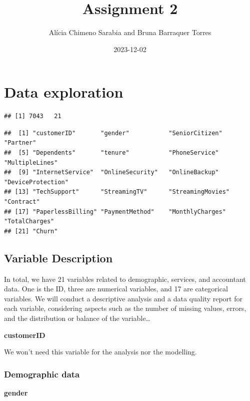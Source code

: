 \documentclass[
  twoside]{article}
\title{Assignment 2}
\author{Alícia Chimeno Sarabia and Bruna Barraquer Torres}
\date{2023-12-02}
\begin{document}
\maketitle

{
\setcounter{tocdepth}{2}
\tableofcontents
}
\newpage

\hypertarget{data-exploration}{%
\section{Data exploration}\label{data-exploration}}

\begin{verbatim}
## [1] 7043   21
\end{verbatim}

\begin{verbatim}
##  [1] "customerID"       "gender"           "SeniorCitizen"    "Partner"         
##  [5] "Dependents"       "tenure"           "PhoneService"     "MultipleLines"   
##  [9] "InternetService"  "OnlineSecurity"   "OnlineBackup"     "DeviceProtection"
## [13] "TechSupport"      "StreamingTV"      "StreamingMovies"  "Contract"        
## [17] "PaperlessBilling" "PaymentMethod"    "MonthlyCharges"   "TotalCharges"    
## [21] "Churn"
\end{verbatim}

\hypertarget{variable-description}{%
\subsection{Variable Description}\label{variable-description}}

In total, we have 21 variables related to demographic, services, and
accountant data. One is the ID, three are numerical variables, and 17
are categorical variables. We will conduct a descriptive analysis and a
data quality report for each variable, considering aspects such as the
number of missing values, errors, and the distribution or balance of the
variable\ldots{}

\textbf{customerID}

We won't need this variable for the analysis nor the modelling.

\hypertarget{demographic-data}{%
\subsubsection{\texorpdfstring{\textbf{Demographic
data}}{Demographic data}}\label{demographic-data}}

\textbf{gender}
\end{document}
